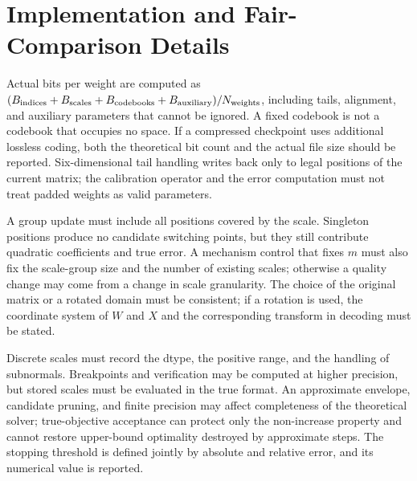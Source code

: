 \section{Implementation and Fair-Comparison Details}
\label{app:impl}

Actual bits per weight are computed as $(B_{\rm indices}+B_{\rm scales}+B_{\rm codebooks}+B_{\rm auxiliary})/N_{\rm weights}$, including tails, alignment, and auxiliary parameters that cannot be ignored.
A fixed codebook is not a codebook that occupies no space.
If a compressed checkpoint uses additional lossless coding, both the theoretical bit count and the actual file size should be reported.
Six-dimensional tail handling writes back only to legal positions of the current matrix; the calibration operator and the error computation must not treat padded weights as valid parameters.

A group update must include all positions covered by the scale.
Singleton positions produce no candidate switching points, but they still contribute quadratic coefficients and true error.
A mechanism control that fixes $m$ must also fix the scale-group size and the number of existing scales; otherwise a quality change may come from a change in scale granularity.
The choice of the original matrix or a rotated domain must be consistent; if a rotation is used, the coordinate system of $W$ and $X$ and the corresponding transform in decoding must be stated.

Discrete scales must record the dtype, the positive range, and the handling of subnormals.
Breakpoints and verification may be computed at higher precision, but stored scales must be evaluated in the true format.
An approximate envelope, candidate pruning, and finite precision may affect completeness of the theoretical solver; true-objective acceptance can protect only the non-increase property and cannot restore upper-bound optimality destroyed by approximate steps.
The stopping threshold is defined jointly by absolute and relative error, and its numerical value is reported.

